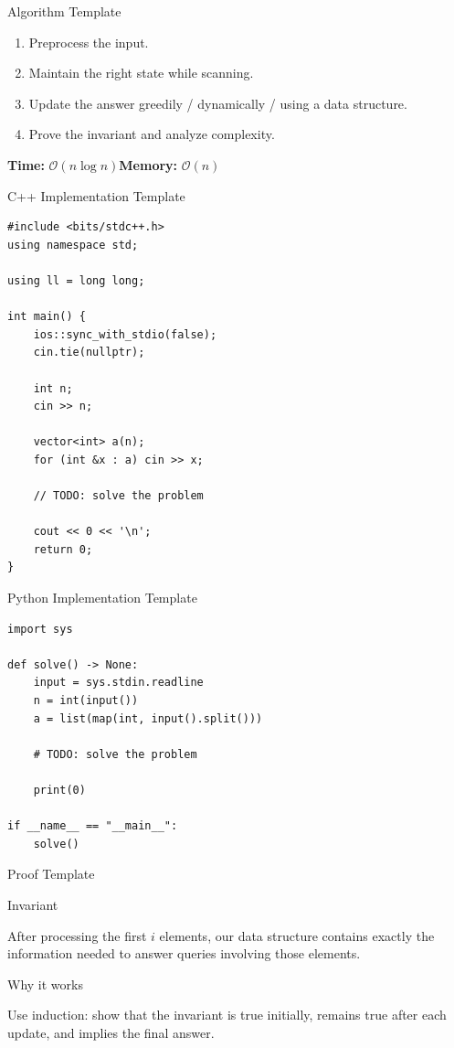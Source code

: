 \documentclass[aspectratio=169,11pt]{beamer}
\newcommand{\bigO}[1]{\ensuremath{\mathcal{O}\!\left(#1\right)}}
\newenvironment{cpbox}[1]{%
  \begin{block}{#1}
  }{%
  \end{block}
}
\newcommand{\complexity}[2]{%
  \vspace{0.2cm}
  \textbf{Time:} \bigO{#1}\hspace{0.7cm}\textbf{Memory:} \bigO{#2}
}
\begin{document}
\begin{frame}{Algorithm Template}
  \begin{enumerate}
    \item Preprocess the input.
    \item Maintain the right state while scanning.
    \item Update the answer greedily / dynamically / using a data structure.
    \item Prove the invariant and analyze complexity.
  \end{enumerate}

  \complexity{n\log n}{n}
\end{frame}

\begin{frame}[fragile]{C++ Implementation Template}
\begin{lstlisting}[style=cppstyle]
#include <bits/stdc++.h>
using namespace std;

using ll = long long;

int main() {
    ios::sync_with_stdio(false);
    cin.tie(nullptr);

    int n;
    cin >> n;

    vector<int> a(n);
    for (int &x : a) cin >> x;

    // TODO: solve the problem

    cout << 0 << '\n';
    return 0;
}
\end{lstlisting}
\end{frame}

\begin{frame}[fragile]{Python Implementation Template}
\begin{lstlisting}[style=pythonstyle]
import sys

def solve() -> None:
    input = sys.stdin.readline
    n = int(input())
    a = list(map(int, input().split()))

    # TODO: solve the problem

    print(0)

if __name__ == "__main__":
    solve()
\end{lstlisting}
\end{frame}

\begin{frame}{Proof Template}
  \begin{cpbox}{Invariant}
    After processing the first $i$ elements, our data structure contains exactly the information needed to answer queries involving those elements.
  \end{cpbox}

  \begin{cpbox}{Why it works}
    Use induction: show that the invariant is true initially, remains true after each update, and implies the final answer.
  \end{cpbox}
\end{frame}
\end{document}
